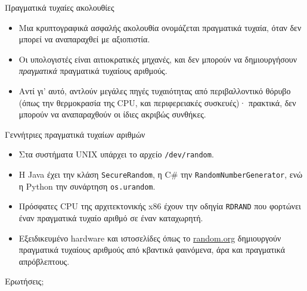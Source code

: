 \documentclass{beamer}
\begin{document}
\begin{frame}{Πραγματικά τυχαίες ακολουθίες}
    \begin{itemize}
        \item<2-> Μια κρυπτογραφικά ασφαλής ακολουθία ονομάζεται \alert{πραγματικά τυχαία}, όταν \alert{δεν μπορεί να αναπαραχθεί με αξιοπιστία}.
        \item<3-> Οι υπολογιστές είναι αιτιοκρατικές μηχανές, και δεν μπορούν να δημιουργήσουν \textit{πραγματικά} πραγματικά τυχαίους αριθμούς.
        \item<4-> Αντί γι' αυτό, αντλούν μεγάλες πηγές τυχαιότητας από περιβαλλοντικό θόρυβο (όπως την θερμοκρασία της CPU, και περιφερειακές συσκευές)· πρακτικά, δεν μπορούν να αναπαραχθούν οι ίδιες ακριβώς συνθήκες.
	\end{itemize}
\end{frame}

\begin{frame}{Γεννήτριες πραγματικά τυχαίων αριθμών}
	\begin{itemize}
        \item<2-> Στα συστήματα UNIX υπάρχει το αρχείο \texttt{/dev/random}.
        \item<3-> H Java έχει την κλάση \texttt{SecureRandom}, η C\# την \texttt{RandomNumberGenerator}, ενώ η Python την συνάρτηση \texttt{os.urandom}.
        \item<4-> Πρόσφατες CPU της αρχιτεκτονικής x86 έχουν την οδηγία \texttt{RDRAND} που φορτώνει έναν πραγματικά τυχαίο αριθμό σε έναν καταχωρητή.
        \item<5-> Εξειδικευμένο hardware και ιστοσελίδες όπως το \href{https://random.org}{random.org} δημιουργούν πραγματικά τυχαίους αριθμούς από κβαντικά φαινόμενα, άρα και πραγματικά απρόβλεπτους.
	\end{itemize}
\end{frame}

\begin{frame}
	\huge{Ερωτήσεις;}
\end{frame}
\end{document}
